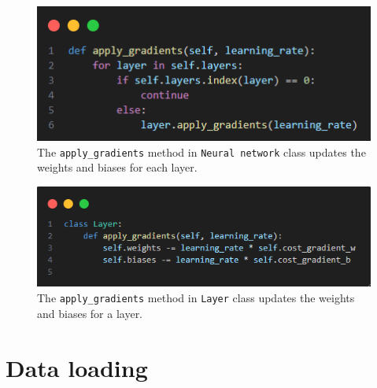 \documentclass{article}
\begin{document}
\begin{figure}[ht]
    \centering 
    \includegraphics[width=1\textwidth]{images/apply-gradients.png}
    \caption{The \texttt{apply\_gradients} method in \texttt{Neural network} class  updates the weights and biases for each layer.}
    \label{fig:apply_gradients}
\end{figure}

\begin{figure}[ht]
    \centering 
    \includegraphics[width=1\textwidth]{images/layer-gradient.png}
    \caption{The \texttt{apply\_gradients} method in \texttt{Layer} class updates the weights and biases for a layer.}
    \label{fig:apply_gradients_on_layer}
\end{figure}
\clearpage
\newpage
\section{Data loading}
\end{document}
